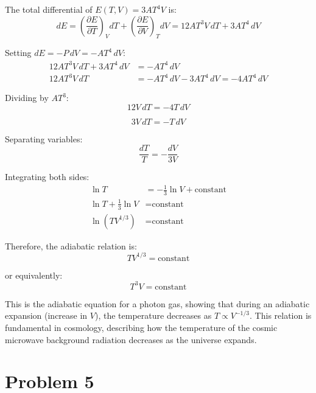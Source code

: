 \documentclass[10pt,twocoloumn]{article}
\begin{document}
The total differential of $E(T,V) = 3AT^4V$ is:
\begin{equation}dE = \left(\frac{\partial E}{\partial T}\right)_V dT + \left(\frac{\partial E}{\partial V}\right)_T dV = 12AT^3V \, dT + 3AT^4 \, dV\end{equation}

Setting $dE = -P \, dV = -AT^4 \, dV$:
\begin{align}
    12AT^3V \, dT + 3AT^4 \, dV &= -AT^4 \, dV\\
12AT^3V \, dT &= -AT^4 \, dV - 3AT^4 \, dV = -4AT^4 \, dV\end{align}

Dividing by $AT^3$:
\begin{equation}12V \, dT = -4T \, dV\end{equation}

\begin{equation}3V \, dT = -T \, dV\end{equation}

Separating variables:
\begin{equation}\frac{dT}{T} = -\frac{dV}{3V}\end{equation}

Integrating both sides:
\begin{align}
    \ln T &= -\frac{1}{3}\ln V + \text{constant}\\
\ln T + \frac{1}{3}\ln V &= \text{constant}\\
\ln(T V^{1/3}) &= \text{constant}
\end{align}

Therefore, the adiabatic relation is:
\begin{equation}\boxed{TV^{1/3} = \text{constant}}\end{equation}

or equivalently:
\begin{equation}\boxed{T^3V = \text{constant}}\end{equation}

This is the adiabatic equation for a photon gas, showing that during an adiabatic expansion (increase in $V$), the temperature decreases as $T \propto V^{-1/3}$. This relation is fundamental in cosmology, describing how the temperature of the cosmic microwave background radiation decreases as the universe expands.
\section*{Problem 5}
\end{document}
